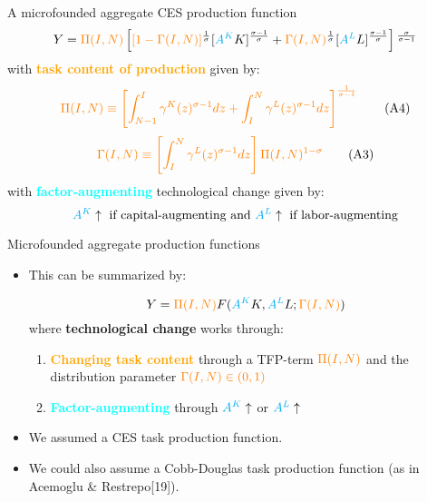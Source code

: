 \documentclass[notes=show]{beamer}
\begin{document}
\begin{frame}{A microfounded aggregate CES production function}
\[
Y= \color{orange} \Pi(I,N) \color{black} \left[ \color{orange} [1- \Gamma(I,N)] \color{black} ^{\frac{1}{\sigma}} [ \color{cyan}A^{K} \color{black}K]^{\frac{\sigma -1}{\sigma}} + \color{orange} \Gamma(I,N)\color{black}^{\frac{1}{\sigma}} [\color{cyan}A^{L}\color{black}L]^{\frac{\sigma -1}{\sigma}} \right]^{\frac{\sigma}{\sigma-1}} 
\]
with \textcolor{orange}{\textbf{task content of production}} given by:
\[
\color{orange} \Pi(I,N) \equiv \left[ \int_{N-1}^{I} \gamma^{K}(z)^{\sigma-1} dz + \int_{I}^{N} \gamma^{L}(z)^{\sigma-1} dz \right]^{\frac{1}{\sigma - 1}} \color{black} \tag{A4} \label{eqA4}
\]
\[
\color{orange} \Gamma(I,N) \equiv \left[ \int_{I}^{N} \gamma^{L}(z)^{\sigma-1} dz \right] \Pi(I,N)^{1-\sigma} \color{black} \tag{A3} \label{eqA3}
\]
with \textcolor{cyan}{\textbf{factor-augmenting}} technological change given by:
\[
\color{cyan} A^{K} \color{black} \uparrow \text{ if capital-augmenting and } \color{cyan} A^{L} \color{black} \uparrow \text{ if labor-augmenting}
\]
\end{frame}

\begin{frame}{Microfounded aggregate production functions}
\begin{itemize}
\item This can be summarized by:
\begin{tcolorbox}
\[
Y = \color{orange} \Pi(I,N) \color{black}F(\color{cyan}A^{K} \color{black}K,\color{cyan}A^{L}\color{black}L; \color{orange}\Gamma(I,N) \color{black}) 
\]
where \textbf{technological change} works through:
\begin{enumerate}
\item \textcolor{orange}{\textbf{Changing task content}} through a TFP-term $\color{orange}\Pi(I,N)$ and the distribution parameter $\color{orange}\Gamma(I,N) \in (0,1)$
\item \textcolor{cyan}{\textbf{Factor-augmenting}} through $\color{cyan} A^{K} \color{black} \uparrow$ or $\color{cyan} A^{L} \color{black} \uparrow$
\end{enumerate}
\end{tcolorbox}
\item We assumed a CES task production function. \medskip
\item We could also assume a Cobb-Douglas task production function (as in Acemoglu \& Restrepo[19]).
\end{itemize}
\end{frame}
\end{document}
